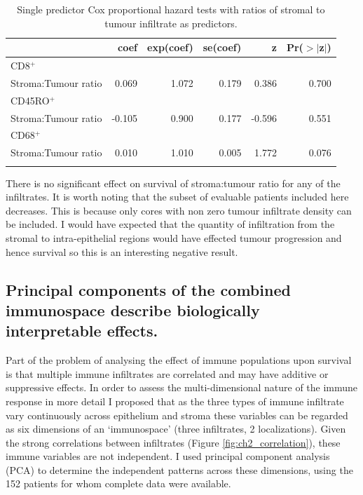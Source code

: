 \begin{table}[ht]
\centering
\begin{tabular}{rrrrrr}
  \hline
 & coef & exp(coef) & se(coef) & z & Pr($>$$|$z$|$) \\ 
  \hline
\multicolumn{5}{l}{

CD8$^+$
}\\
Stroma:Tumour ratio & 0.069 & 1.072 & 0.179 & 0.386 & 0.700 \\ 
 
\multicolumn{5}{l}{CD45RO$^+$
}\\
Stroma:Tumour ratio & -0.105 & 0.900 & 0.177 & -0.596 & 0.551 \\ 

\multicolumn{5}{l}{

CD68$^+$
}\\
Stroma:Tumour ratio & 0.010 & 1.010 & 0.005 & 1.772 & 0.076 \\ 
   \hline
\multicolumn{5}{l}{}\\
\end{tabular}
\caption[Cox regression for ratio of Tumour to Stroma infiltrate]{Single predictor Cox proportional hazard tests with ratios of stromal to tumour infiltrate as predictors.} 
\label{tab:s:t}
\end{table}
There is no significant effect on survival of stroma:tumour ratio for any of the infiltrates. It is worth noting that the subset of evaluable patients included here decreases. This is because only cores with non zero tumour infiltrate density can be included. I would have expected that the quantity of infiltration from the stromal to intra-epithelial regions would have effected tumour progression and hence survival so this is an interesting negative result.

\subsection{Principal components of the combined immunospace describe biologically interpretable effects.}
 Part of the problem of analysing the effect of immune populations upon survival is that multiple immune infiltrates are correlated and may have additive or suppressive effects.  In order to assess the multi-dimensional nature of the immune response in more detail I proposed that as the three types of immune infiltrate vary continuously across epithelium and stroma these variables can be regarded as six dimensions of an ‘immunospace’ (three infiltrates, 2 localizations).  Given the strong correlations between infiltrates (Figure \ref{fig:ch2_correlation}), these immune variables are not independent. I used principal component analysis (PCA) to determine the independent patterns across these dimensions, using the 152 patients for whom complete data were available.
 
